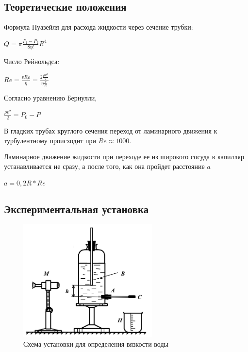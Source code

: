 \documentclass[a4paper]{article}
\begin{document}
\subsection{Теоретические положения}
Формула Пуазейля для расхода жидкости через сечение трубки:
\begin{center}
$Q = \pi \frac{P_1-P_2}{8 \eta l} R^4$
\end{center}

Число Рейнольдса:
\begin{center}
$Re = \frac{v R \rho}{\eta} = \frac{2\frac{\rho v^2}{2}}{\eta \frac{v}{R}}$
\end{center}
Согласно уравнению Бернулли, 
\begin{center}
$\frac{\rho v^2}{2} = P_0 - P$
\end{center}

В гладких трубах круглого сечения переход от ламинарного движения к турбулентному происходит при $Re \approx 1000$.

Ламинарное движение жидкости при переходе ее из широкого сосуда в капилляр устанавливается не сразу, а после того, как она пройдет расстояние $a$
\begin{center}
$a = 0,2R * Re$
\end{center}

\subsection{Экспериментальная установка}

\begin{figure}[h]
    \centering
    \includegraphics[width=7cm]{setup1.PNG}
    \caption{Схема установки для определения вязкости воды}
    \label{fig:vac}
\end{figure}
\end{document}
